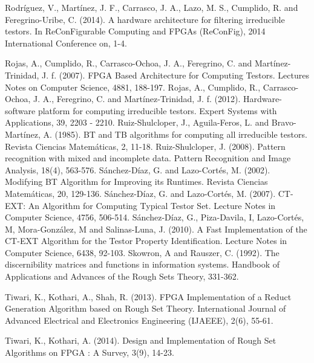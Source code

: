 \documentclass[authoryear,preprint,review,12pt]{elsarticle}
\begin{document}
\begin{thebibliography}{00}
 Rodr\'iguez, V., Mart\'inez, J. F., Carrasco, J. A., Lazo, M. S., Cumplido, R. and Feregrino-Uribe, C. (2014). A hardware architecture for filtering irreducible testors. In ReConFigurable Computing and FPGAs (ReConFig), 2014 International Conference on, 1-4.

Rojas, A., Cumplido, R., Carrasco-Ochoa, J. A., Feregrino, C. and Mart\'inez-Trinidad, J. f. (2007). FPGA Based Architecture for Computing Testors. Lectures Notes on Computer Science, 4881, 188-197.
Rojas, A., Cumplido, R., Carrasco-Ochoa, J. A., Feregrino, C. and Mart\'inez-Trinidad, J. f. (2012). Hardware-software platform for computing irreducible testors. Expert Systems with Applications, 39, 2203 - 2210.
Ruiz-Shulcloper, J., Aguila-Feros, L. and Bravo-Mart\'inez, A. (1985). BT and TB algorithms for computing all irreducible testors. Revista Ciencias Matem\'aticas, 2, 11-18.
Ruiz-Shulcloper, J. (2008). Pattern recognition with mixed and incomplete data. Pattern Recognition and Image Analysis, 18(4), 563-576.
S\'anchez-D\'iaz, G. and Lazo-Cort\'es, M. (2002). Modifying BT Algorithm for Improving its Runtimes. Revista Ciencias Matem\'aticas, 20, 129-136.
S\'anchez-D\'iaz, G. and Lazo-Cort\'es, M. (2007). CT-EXT: An Algorithm for Computing Typical Testor Set. Lecture Notes in Computer Science, 4756, 506-514.
S\'anchez-D\'iaz, G., Piza-Davila, I, Lazo-Cort\'es, M, 
Mora-Gonz\'alez, M and Salinas-Luna, J. (2010). A Fast Implementation of the CT-EXT Algorithm for the Testor Property Identification. Lecture Notes in Computer Science, 6438, 92-103.
Skowron, A and Rauszer, C. (1992). The discernibility matrices and functions in information systems. Handbook of Applications and Advances of the Rough Sets Theory, 331-362.

Tiwari, K., Kothari, A., Shah, R. (2013). FPGA Implementation of a Reduct Generation Algorithm based on Rough Set Theory. International Journal of Advanced Electrical and Electronics Engineering (IJAEEE), 2(6), 55-61.

 Tiwari, K., Kothari, A. (2014). Design and Implementation of Rough Set Algorithms on FPGA : A Survey, 3(9), 14-23.


\end{thebibliography}
\end{document}
